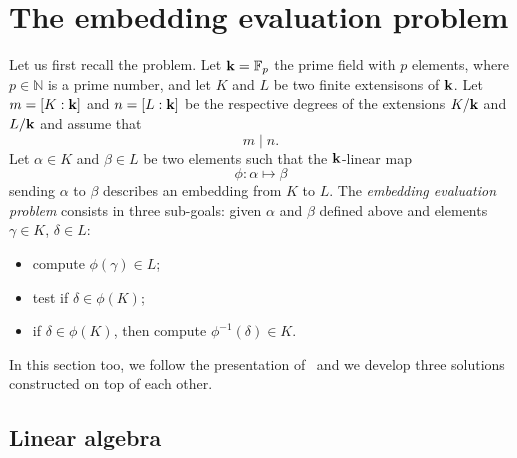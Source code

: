\section{The embedding evaluation problem}
\label{sec:evaluation}

Let us first recall the problem. Let $\mathbf{k}=\mathbb{F}_p$ the prime field with $p$
elements, where $p\in\mathbb{N}$ is a prime number, and let $K$ and $L$ be
two finite extensisons of $\mathbf{k}$. Let $m=\left[ K:\mathbf{k} \right]$ and $n = \left[ L:\mathbf{k}
\right]$ be the respective degrees of the extensions $K/\mathbf{k}$ and $L/\mathbf{k}$ and
assume that
\[
  m\mid n.
\]
Let $\alpha\in K$ and $\beta\in L$ be two elements such that the $\mathbf{k}$-linear map
\[
  \phi:\alpha\mapsto\beta
\]
sending $\alpha$ to $\beta$ describes an embedding from $K$ to $L$. The
\emph{embedding evaluation problem} consists in three sub-goals: given $\alpha$
and $\beta$ defined above and elements $\gamma\in K$, $\delta\in L$:
\begin{itemize}
  \item compute $\phi(\gamma)\in L$;
  \item test if $\delta\in\phi(K)$;
  \item if $\delta\in\phi(K)$, then compute $\phi^{-1}(\delta)\in K$.
\end{itemize}
In this section too, we follow the presentation of~\cite{BDDFS17} and we develop
three solutions constructed on top of each other.

\subsection{Linear algebra}
\label{sec:linalg}

